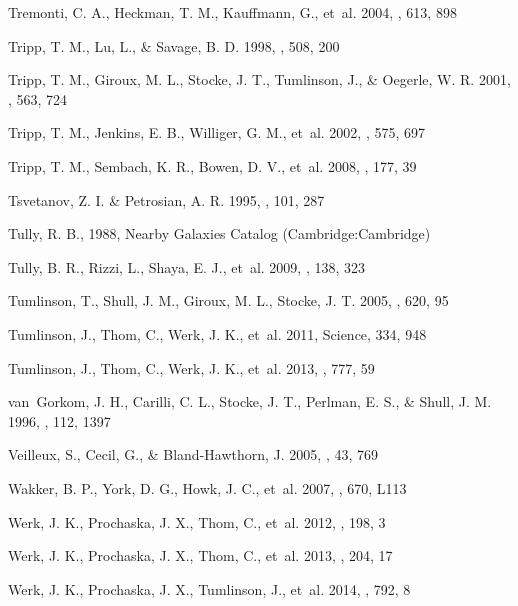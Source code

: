 \documentclass[twocolumn,twocolappendix,tighten,times]{aastex6}
\begin{document}
\begin{thebibliography}
 Tremonti, C. A., Heckman, T. M., Kauffmann, G., et~al. 2004, \apj, 613, 898

 Tripp, T. M., Lu, L., \& Savage, B. D. 1998, \apj, 508, 200

 Tripp, T. M., Giroux, M. L., Stocke, J. T., Tumlinson, J., \& Oegerle, W. R. 2001, \apj, 563, 724

 Tripp, T. M., Jenkins, E. B., Williger, G. M., et~al. 2002, \apj, 575, 697

 Tripp, T. M., Sembach, K. R., Bowen, D. V., et~al. 2008, \apjs, 177, 39

 Tsvetanov, Z. I. \& Petrosian, A. R. 1995, \apjs, 101, 287

 Tully, R. B., 1988, Nearby Galaxies Catalog (Cambridge:Cambridge)

 Tully, B. R., Rizzi, L., Shaya, E. J., et~al. 2009, \aj, 138, 323

 Tumlinson, T., Shull, J. M., Giroux, M. L., Stocke, J. T. 2005, \apj, 620, 95

 Tumlinson, J., Thom, C., Werk, J. K., et~al. 2011, Science, 334, 948

 Tumlinson, J., Thom, C., Werk, J. K., et~al. 2013, \apj, 777, 59

 van~Gorkom, J. H., Carilli, C. L., Stocke, J. T., Perlman, E. S., \& Shull, J. M. 1996, \aj, 112, 1397

 Veilleux, S., Cecil, G., \& Bland-Hawthorn, J. 2005, \araa, 43, 769

 Wakker, B. P., York, D. G., Howk, J. C., et~al. 2007, \apj, 670, L113

 Werk, J. K., Prochaska, J. X., Thom, C., et~al. 2012, \apjs, 198, 3

 Werk, J. K., Prochaska, J. X., Thom, C., et~al. 2013, \apjs, 204, 17

 Werk, J. K., Prochaska, J. X., Tumlinson, J., et~al. 2014, \apj, 792, 8


\end{thebibliography}
\end{document}

